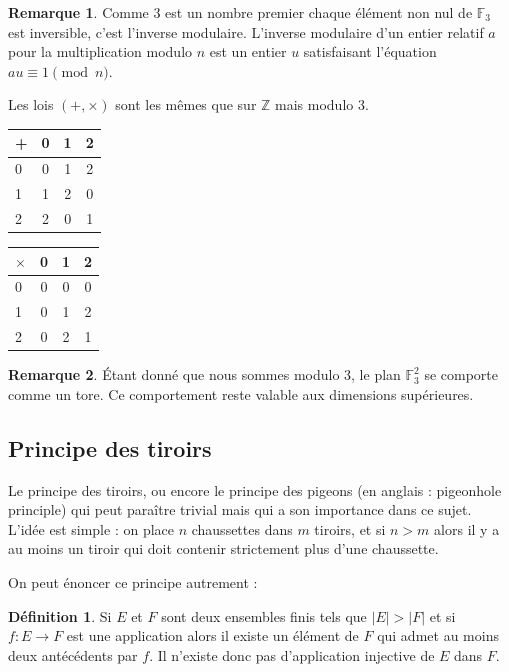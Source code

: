 \documentclass[a4paper,12pt,titlepage]{article}
\theoremstyle{plain}
\theoremstyle{definition}
\newtheorem{defi}{Définition}
\newtheorem{rmq}{Remarque}
\newcommand{\Ftrois}[1]{\mathbb{F}^#1_3}
\begin{document}
\begin{rmq}
  Comme 3 est un nombre premier chaque élément non nul de $\mathbb{F}_3$ est inversible, c'est l'inverse modulaire. L'inverse modulaire d'un entier relatif $a$ pour la multiplication modulo $n$ est un entier $u$ satisfaisant l'équation $au \equiv 1 \pmod{n}$.
\end{rmq}

Les lois $(+,\times)$ sont les mêmes que sur $\mathbb{Z}$ mais modulo 3.
\begin{center}
  \begin{tabular}{ l | c c c }
    + & 0 & 1 & 2 \\
    \hline
    0 & 0 & 1 & 2\\
    1 & 1 & 2 & 0\\
    2 & 2 & 0 & 1\\
  \end{tabular}
  \qquad
  \begin{tabular}{ l | c c c }
    $\times$ & 0 & 1 & 2 \\
    \hline
    0 & 0 & 0 & 0\\
    1 & 0 & 1 & 2\\
    2 & 0 & 2 & 1\\
  \end{tabular}
\end{center}


\begin{rmq}
\'{E}tant donné que nous sommes modulo 3, le plan $\Ftrois{2}$ se comporte comme un tore.
Ce comportement reste valable aux dimensions supérieures.
\end{rmq}

\subsection{Principe des tiroirs}
Le principe des tiroirs, ou encore le principe des pigeons (en anglais : pigeonhole principle) qui peut paraître trivial mais qui a son importance dans ce sujet.
L’idée est simple : on place $n$ chaussettes dans $m$ tiroirs, et si $n>m$ alors il y a au moins un tiroir qui doit contenir strictement plus d’une chaussette.

On peut énoncer ce principe autrement : 
\begin{defi}
  Si $E$ et $F$ sont deux ensembles finis tels que $|E|>|F|$ et si $f:E \to F$ est une application alors il existe un élément de $F$ qui admet au moins deux
  antécédents par $f$. 
  Il n’existe donc pas d’application injective de $E$ dans $F$.
\end{defi}
\end{document}
